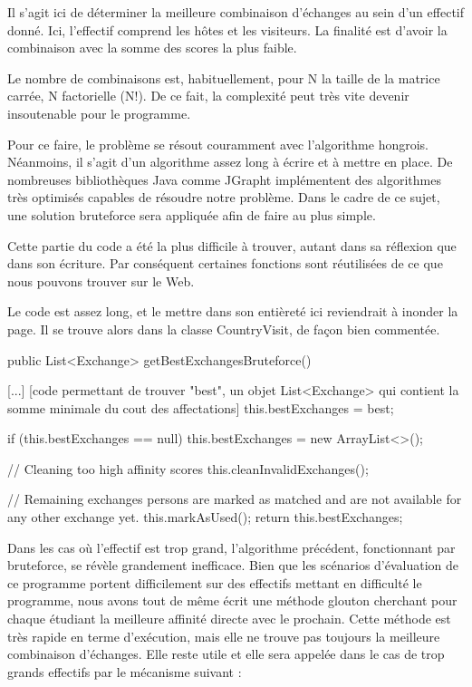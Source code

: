 \documentclass{mytex}
\begin{document}

Il s'agit ici de déterminer la meilleure combinaison d'échanges au sein d'un effectif donné. Ici, l'effectif comprend les hôtes et les visiteurs. La finalité est d'avoir la combinaison avec la somme des scores la plus faible.

Le nombre de combinaisons est, habituellement, pour N la taille de la matrice carrée, N factorielle (N!). De ce fait, la complexité peut très vite devenir insoutenable pour le programme.

Pour ce faire, le problème se résout couramment avec l'algorithme hongrois. Néanmoins, il s'agit d'un algorithme assez long à écrire et à mettre en place. De nombreuses bibliothèques Java comme JGrapht implémentent des algorithmes très optimisés capables de résoudre notre problème. Dans le cadre de ce sujet, une solution bruteforce sera appliquée afin de faire au plus simple.

Cette partie du code a été la plus difficile à trouver, autant dans sa réflexion que dans son écriture. Par conséquent certaines fonctions sont réutilisées de ce que nous pouvons trouver sur le Web.

Le code est assez long, et le mettre dans son entièreté ici reviendrait à inonder la page. Il se trouve alors dans la classe CountryVisit, de façon bien commentée.

\begin{codebox}
public List<Exchange> getBestExchangesBruteforce() {
    [...]
	[code permettant de trouver "best", un objet List<Exchange> qui contient la somme minimale du cout des affectations]
%	
    this.bestExchanges = best;

	if (this.bestExchanges == null) {
		this.bestExchanges = new ArrayList<>();
	}
	
	// Cleaning too high affinity scores
	this.cleanInvalidExchanges();
	
	// Remaining exchanges persons are marked as matched and are not available for any other exchange yet.
	this.markAsUsed();
	return this.bestExchanges;
}
\end{codebox}


Dans les cas où l'effectif est trop grand, l'algorithme précédent, fonctionnant par bruteforce, se révèle grandement inefficace. Bien que les scénarios d'évaluation de ce programme portent difficilement sur des effectifs mettant en difficulté le programme, nous avons tout de même écrit une méthode glouton cherchant pour chaque étudiant la meilleure affinité directe avec le prochain. Cette méthode est très rapide en terme d'exécution, mais elle ne trouve pas toujours la meilleure combinaison d'échanges. Elle reste utile et elle sera appelée dans le cas de trop grands effectifs par le mécanisme suivant :
\end{document}
